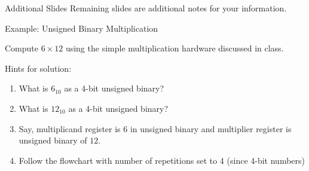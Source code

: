 \begin{frame}{Additional Slides}
    Remaining slides are additional notes for your information.
\end{frame}


\begin{frame}{Example: Unsigned Binary Multiplication}
    \begin{tcolorbox}[enhanced,attach boxed title to top center={yshift=-3mm,yshifttext=-1mm},
  colback=red!5!white,colframe=red!75!black,colbacktitle=red!80!black,
  title=Try this,fonttitle=\bfseries,
  boxed title style={size=small,colframe=red!50!black} ]
  Compute $6 \times 12$ using the simple multiplication hardware discussed in class.
   \end{tcolorbox}
Hints for solution:
  \begin{enumerate}      
      \item What is $6_{10}$ as a 4-bit unsigned binary?
\item What is $12_{10}$ as a 4-bit unsigned binary?
\item Say, multiplicand  register is $6$ in unsigned binary and multiplier register is unsigned binary of $12$. 
\item Follow the flowchart with number of repetitions set to 4 (since 4-bit numbers)
  \end{enumerate}
 
\end{frame}

